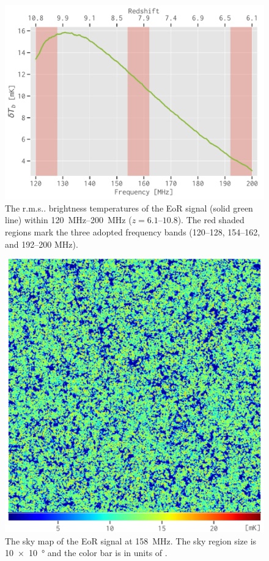 \documentclass[twocolumn]{aastex62}
\makeatletter
\newcommand{\rms}{r.m.s\@ifnextchar.{}{.\@}}
\makeatother
\begin{document}
\begin{figure}
  \centering
  \includegraphics[width=\columnwidth]{eos2016-tbrms}
  \caption{\label{fig:eor-tbrms}%
    The \rms{} brightness temperatures of the EoR signal
    (solid green line) within \SIrange{120}{200}{\MHz}
    ($z = \numrange{6.1}{10.8}$).
    The red shaded regions mark the three adopted frequency bands
    (\numrange{120}{128}, \numrange{154}{162}, and \numrange{192}{200}
    \si{\MHz}).
  }
\end{figure}

\begin{figure}
  \centering
  \includegraphics[width=\columnwidth]{21cm-f158}
  \caption{\label{fig:map-eor}%
    The sky map of the EoR signal at \SI{158}{\MHz}.
    The sky region size is \SI[product-units=repeat]{10 x 10}{\degree}
    and the color bar is in units of \si{\mK}.
  }
\end{figure}
\end{document}
